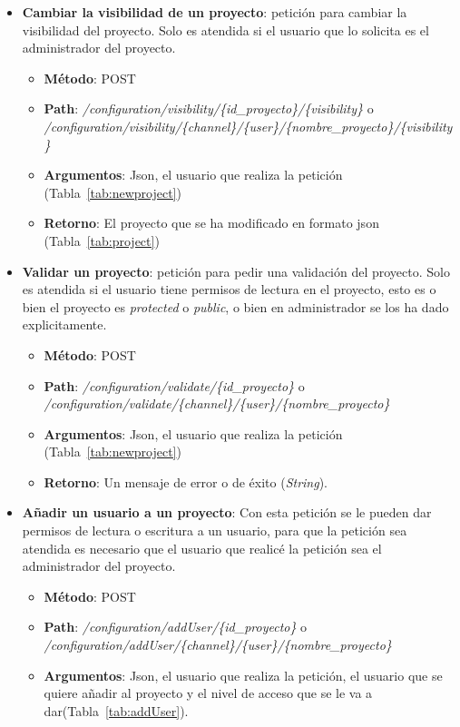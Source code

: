 \begin{itemize}
\item \textbf{Cambiar la visibilidad de un proyecto}: petición para cambiar la visibilidad del proyecto. Solo es atendida si el usuario que lo solicita es el administrador del proyecto.
	\begin{itemize}
	\item \textbf{Método}: POST
	\item \textbf{Path}: \textit{/configuration/visibility/\{id\_proyecto\}/\{visibility\}} o\\ \textit{/configuration/visibility/\{channel\}/\{user\}/\{nombre\_proyecto\}/\{visibility\}}
	\item \textbf{Argumentos}: Json, el usuario que realiza la petición (Tabla~\ref{tab:newproject})
	\item \textbf{Retorno}: El proyecto que se ha modificado en formato json (Tabla~\ref{tab:project})	
	\end{itemize}
\item \textbf{Validar un proyecto}: petición para pedir una validación del proyecto. Solo es atendida si el usuario tiene permisos de lectura en el proyecto, esto es o bien el proyecto es \textit{protected} o \textit{public}, o bien en administrador se los ha dado explicitamente. 
	\begin{itemize}
	\item \textbf{Método}: POST
	\item \textbf{Path}: \textit{/configuration/validate/\{id\_proyecto\}} o\\ \textit{/configuration/validate/\{channel\}/\{user\}/\{nombre\_proyecto\}}
	\item \textbf{Argumentos}: Json, el usuario que realiza la petición (Tabla~\ref{tab:newproject})
	\item \textbf{Retorno}: Un mensaje de error o de éxito (\textit{String}).	
	\end{itemize}
\item \textbf{Añadir un usuario a un proyecto}: Con esta petición se le pueden dar permisos de lectura o escritura a un usuario, para que la petición sea atendida es necesario que el usuario que realicé la petición sea el administrador del proyecto.
	\begin{itemize}
	\item \textbf{Método}: POST
	\item \textbf{Path}: \textit{/configuration/addUser/\{id\_proyecto\}} o\\ \textit{/configuration/addUser/\{channel\}/\{user\}/\{nombre\_proyecto\}}
	\item \textbf{Argumentos}: Json, el usuario que realiza la petición, el usuario que se quiere añadir al proyecto y el nivel de acceso que se le va a dar(Tabla~\ref{tab:addUser}).\\
		\begin{table}[h]
		\centering
		

\end{table}
\end{itemize}
\end{itemize}
